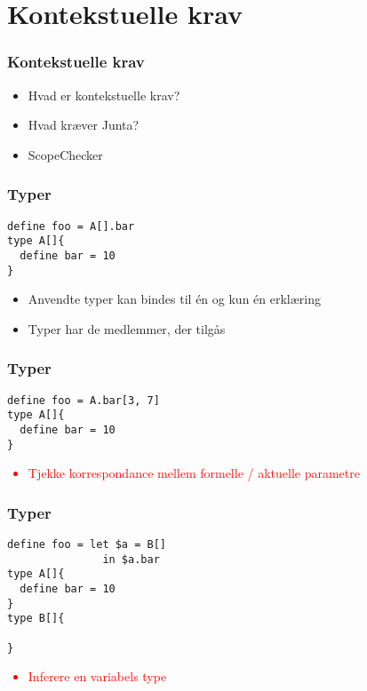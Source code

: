 \section{Kontekstuelle krav}

\begin{frame}
\frametitle{Kontekstuelle krav}
\begin{center}
\begin{itemize}
\item Hvad er kontekstuelle krav?
\item Hvad kræver Junta?
\item ScopeChecker
\end{itemize}
\end{center}
\end{frame}


\begin{frame}[fragile]
\frametitle{Typer}
\begin{lstlisting}
define foo = A[].bar
type A[]{
  define bar = 10
}
\end{lstlisting}
\begin{center}
\begin{itemize}                                  
\item Anvendte typer kan bindes til én og kun én erklæring
\item Typer har de medlemmer, der tilgås
\end{itemize}
\end{center}
\end{frame}

\begin{frame}[fragile]

\end{frame}

\begin{frame}[fragile]
\frametitle{Typer}
\begin{lstlisting}
define foo = A.bar[3, 7]
type A[]{
  define bar = 10
}
\end{lstlisting}
\begin{center}
\textcolor{red}{
\begin{itemize}                                  
\item Tjekke korrespondance mellem formelle / aktuelle parametre
\end{itemize}
}
\end{center}
\end{frame}

\begin{frame}[fragile]
\frametitle{Typer}
\begin{lstlisting}
define foo = let $a = B[]
               in $a.bar
type A[]{
  define bar = 10
}
type B[]{

}
\end{lstlisting}
\begin{center}
\textcolor{red}{
\begin{itemize}                                  
\item Inferere en variabels type
\end{itemize}
}
\end{center}
\end{frame}

